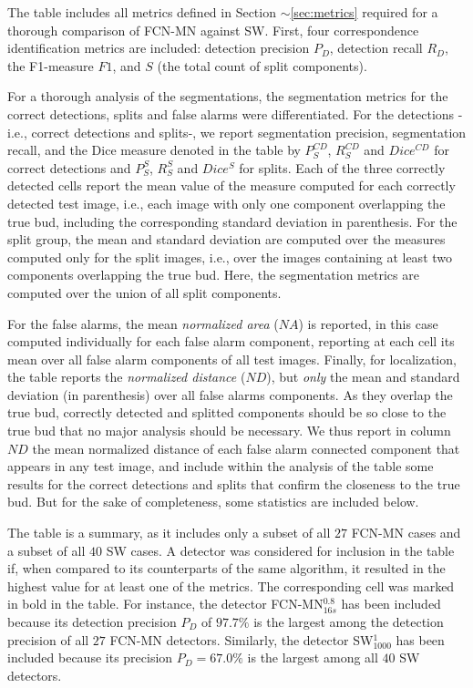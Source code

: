 \documentclass[a4paper,authoryear,review]{elsarticle}
\begin{document}
	The table includes all metrics defined in Section $\sim$\ref{sec:metrics} required for a thorough comparison of FCN-MN against SW. First, four correspondence identification metrics are included: detection precision $P_D$, detection recall $R_D$, the F1-measure  $F1$, and $S$ (the total count of split components). 
	
	For a thorough analysis of the segmentations, the segmentation metrics for the correct detections, splits and false alarms were differentiated. For the detections -i.e., correct detections and splits-, we report segmentation precision, segmentation recall, and the Dice measure denoted in the table by $P_S^{CD}$, $R_S^{CD}$ and $Dice^{CD}$ for correct detections and $P_S^S$, $R_S^S$ and $Dice^S$ for splits.  Each of the three correctly detected cells report the mean value of the measure computed for each correctly detected test image, i.e., each image with only one component overlapping the true bud, including the corresponding standard deviation  in parenthesis. For the split group, the mean and standard deviation are computed over the measures computed only for the split images, i.e., over the images containing at least two components overlapping the true bud. Here, the segmentation metrics are computed over the union of all split components. 
	
	For the false alarms, the mean \emph{normalized area} ($NA$) is reported, in this case computed individually for each false alarm component, reporting at each cell its mean over all false alarm components of all test images. Finally, for localization, the table reports the \emph{normalized distance} ($ND$), but \emph{only} the mean and standard deviation (in parenthesis) over all false alarms components. As they overlap the true bud, correctly detected and splitted components should be so close to the true bud that no major analysis should be necessary. We thus report in column $ND$ the mean normalized distance of each false alarm connected component that appears in any test image, and include within the analysis of the table some results for the correct detections and splits that confirm the closeness to the true bud. But for the sake of completeness,  some statistics are included below. 
	
	The table is a summary, as it includes only a subset of all $27$ FCN-MN cases and a subset of all $40$ SW cases. A detector was considered for inclusion in the table if, when compared to its counterparts of the same algorithm, it resulted in the highest value for at least one of the metrics. The corresponding cell was marked in bold in the table. For instance, the detector FCN-MN$_{16s}^{0.8}$ has been included because its detection precision $P_D$ of $97.7\%$ is the largest among the detection precision of all $27$ FCN-MN detectors. Similarly, the detector SW$_{1000}^1$ has been included because its precision $P_D = 67.0\%$ is the largest among all $40$ SW detectors. 
	
\end{document}
